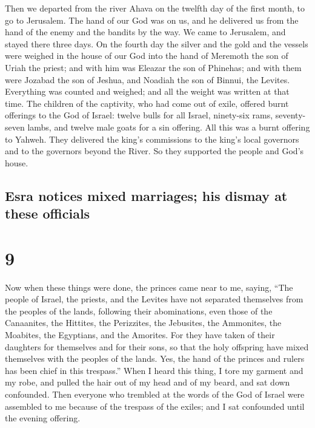  Then we departed from the river Ahava on the twelfth day
of the first month, to go to Jerusalem. The hand of our God was on us,
and he delivered us from the hand of the enemy and the bandits by the
way.  We came to Jerusalem, and stayed there three days.
 On the fourth day the silver and the gold and the
vessels were weighed in the house of our God into the hand of Meremoth
the son of Uriah the priest; and with him was Eleazar the son of
Phinehas; and with them were Jozabad the son of Jeshua, and Noadiah the
son of Binnui, the Levites.  Everything was counted and
weighed; and all the weight was written at that time. 
The children of the captivity, who had come out of exile, offered burnt
offerings to the God of Israel: twelve bulls for all Israel, ninety-six
rams, seventy-seven lambs, and twelve male goats for a sin offering. All
this was a burnt offering to Yahweh.  They delivered the
king's commissions to the king's local governors and to the governors
beyond the River. So they supported the people and God's house.

\hypertarget{esra-notices-mixed-marriages-his-dismay-at-these-officials}{%
\subsection{Esra notices mixed marriages; his dismay at these
officials}\label{esra-notices-mixed-marriages-his-dismay-at-these-officials}}

\hypertarget{section-8}{%
\section{9}\label{section-8}}

 Now when these things were done, the princes came near to
me, saying, ``The people of Israel, the priests, and the Levites have
not separated themselves from the peoples of the lands, following their
abominations, even those of the Canaanites, the Hittites, the
Perizzites, the Jebusites, the Ammonites, the Moabites, the Egyptians,
and the Amorites.  For they have taken of their daughters
for themselves and for their sons, so that the holy offspring have mixed
themselves with the peoples of the lands. Yes, the hand of the princes
and rulers has been chief in this trespass.''  When I
heard this thing, I tore my garment and my robe, and pulled the hair out
of my head and of my beard, and sat down confounded.  Then
everyone who trembled at the words of the God of Israel were assembled
to me because of the trespass of the exiles; and I sat confounded until
the evening offering.

